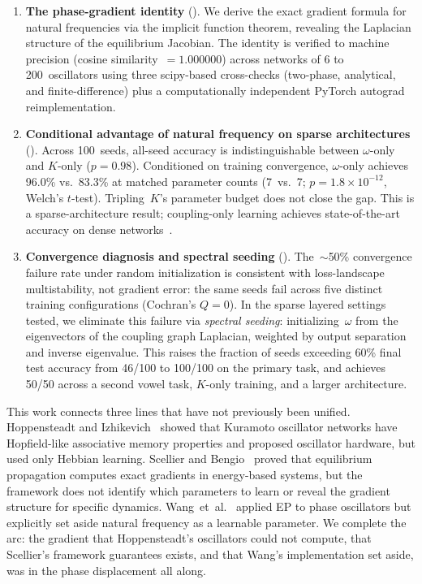 \documentclass[11pt,a4paper]{article}
\begin{document}
\begin{enumerate}
  \item \textbf{The phase-gradient identity} (). We
    derive the exact gradient formula for natural frequencies via the
    implicit function theorem, revealing the Laplacian structure of the
    equilibrium Jacobian. The identity is verified to machine precision
    (cosine similarity~$= 1.000000$) across networks of 6 to
    200~oscillators using three scipy-based cross-checks
    (two-phase, analytical, and finite-difference) plus a computationally
    independent PyTorch autograd reimplementation.

  \item \textbf{Conditional advantage of natural frequency on sparse
    architectures}
    (). Across 100~seeds, all-seed accuracy is
    indistinguishable between $\omega$-only and $K$-only ($p = 0.98$).
    Conditioned on training convergence, $\omega$-only achieves
    96.0\% vs.\ 83.3\% at matched parameter counts (7~vs.~7;
    $p = 1.8 \times 10^{-12}$, Welch's $t$-test). Tripling~$K$'s parameter budget
    does not close the gap. This is a sparse-architecture result;
    coupling-only learning achieves state-of-the-art accuracy on
    dense networks~\citep{wang2024training, rageau2025training}.

  \item \textbf{Convergence diagnosis and spectral seeding}
    (). The~$\sim$50\% convergence failure rate
    under random initialization is consistent with loss-landscape
    multistability, not gradient error: the same seeds fail across five
    distinct training configurations (Cochran's $Q = 0$). In the sparse
    layered settings tested, we eliminate this failure via \emph{spectral
    seeding}: initializing~$\omega$ from the eigenvectors of the coupling
    graph Laplacian, weighted by output separation and inverse eigenvalue.
    This raises the fraction of seeds exceeding 60\% final test accuracy
    from 46/100 to 100/100 on the primary task, and achieves 50/50
    across a second vowel task, $K$-only training, and a larger
    architecture.
\end{enumerate}

This work connects three lines that have not previously been unified.
Hoppensteadt and Izhikevich~\citeyearpar{hoppensteadt1999oscillatory} showed
that Kuramoto oscillator networks have Hopfield-like associative memory
properties and proposed oscillator hardware, but used only Hebbian
learning. Scellier and Bengio~\citeyearpar{scellier2017equilibrium} proved that
equilibrium propagation computes exact gradients in energy-based systems,
but the framework does not identify which parameters to learn or reveal the
gradient structure for specific dynamics. Wang~et~al.~\citeyearpar{wang2024training}
applied EP to phase oscillators but explicitly set aside natural
frequency as a learnable parameter. We complete the arc: the gradient
that Hoppensteadt's oscillators could not compute, that Scellier's
framework guarantees exists, and that Wang's implementation set aside,
was in the phase displacement all along.
\end{document}
